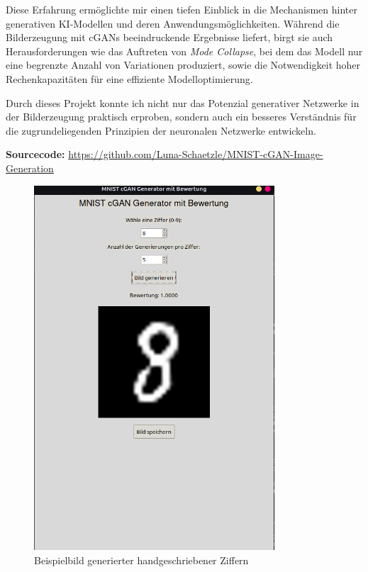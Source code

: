 \documentclass[a4paper,12pt]{article}
\begin{document}
Diese Erfahrung ermöglichte mir einen tiefen Einblick in die Mechanismen hinter generativen KI-Modellen und deren Anwendungsmöglichkeiten. Während die Bilderzeugung mit cGANs beeindruckende Ergebnisse liefert, birgt sie auch Herausforderungen wie das Auftreten von \textit{Mode Collapse}, bei dem das Modell nur eine begrenzte Anzahl von Variationen produziert, sowie die Notwendigkeit hoher Rechenkapazitäten für eine effiziente Modelloptimierung.

Durch dieses Projekt konnte ich nicht nur das Potenzial generativer Netzwerke in der Bilderzeugung praktisch erproben, sondern auch ein besseres Verständnis für die zugrundeliegenden Prinzipien der neuronalen Netzwerke entwickeln.

\vspace{0.5cm} \noindent \textbf{Sourcecode:} \url{https://github.com/Luna-Schaetzle/MNIST-cGAN-Image-Generation}

\begin{figure}[h]
    \centering
    \includegraphics[width=0.8\textwidth]{image.png}
    \caption{Beispielbild generierter handgeschriebener Ziffern}
    \label{fig:example}
\end{figure}
\end{document}
